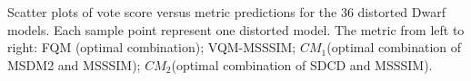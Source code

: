 Scatter plots of vote score versus metric predictions for the 36 distorted Dwarf models. Each sample point represent one distorted model. The metric from left to right: FQM \cite{Tian_2004}(optimal combination); VQM-MSSSIM; $CM_1$(optimal combination of MSDM2 \cite{Lavou__2011} and MSSSIM); $CM_2$(optimal combination of SDCD and MSSSIM).